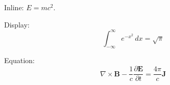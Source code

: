 \documentclass{article}
\begin{document}
Inline: \(E = mc^2\).

Display:
\[
\int_{-\infty}^{\infty} e^{-x^2}\,dx = \sqrt{\pi}
\]

Equation:
\begin{equation}
\nabla \times \mathbf{B} - \frac{1}{c}\frac{\partial\mathbf{E}}{\partial t} = \frac{4\pi}{c}\mathbf{J}
\end{equation}
\end{document}
